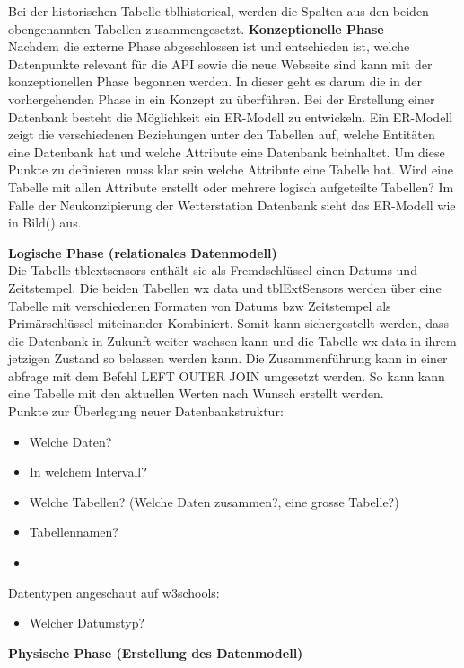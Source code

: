 Bei der historischen Tabelle tblhistorical, werden die Spalten aus den beiden obengenannten Tabellen zusammengesetzt.
\textbf{Konzeptionelle Phase}\\
Nachdem die externe Phase abgeschlossen ist und entschieden ist, welche Datenpunkte relevant für die API sowie die neue Webseite sind kann mit der konzeptionellen Phase begonnen werden. In dieser geht es darum die in der vorhergehenden Phase in ein Konzept zu überführen. Bei der Erstellung einer Datenbank besteht die Möglichkeit ein ER-Modell zu entwickeln. Ein ER-Modell zeigt die verschiedenen Beziehungen unter den Tabellen auf, welche Entitäten eine Datenbank hat und welche Attribute eine Datenbank beinhaltet. Um diese Punkte zu definieren muss klar sein welche Attribute eine Tabelle hat. Wird eine Tabelle mit allen Attribute erstellt oder mehrere logisch aufgeteilte Tabellen? Im Falle der Neukonzipierung der Wetterstation Datenbank sieht das ER-Modell wie in Bild() aus.

\textbf{Logische Phase (relationales Datenmodell)}\\
Die Tabelle tblextsensors  enthält sie als Fremdschlüssel einen Datums und Zeitstempel. Die beiden Tabellen wx data und tblExtSensors werden über eine Tabelle mit verschiedenen Formaten von Datums bzw Zeitstempel als Primärschlüssel miteinander Kombiniert. Somit kann sichergestellt werden, dass die Datenbank in Zukunft weiter wachsen kann und die Tabelle wx data in ihrem jetzigen Zustand so belassen werden kann. Die Zusammenführung kann in einer abfrage mit dem Befehl LEFT OUTER JOIN umgesetzt werden. So kann kann eine Tabelle mit den aktuellen Werten nach Wunsch erstellt werden.
\\

Punkte zur Überlegung neuer Datenbankstruktur:
\begin{itemize}
\item Welche Daten?
\item In welchem Intervall?
\item Welche Tabellen? (Welche Daten zusammen?, eine grosse Tabelle?)
\item Tabellennamen?
\item
\end{itemize}

Datentypen angeschaut auf w3schools:
\begin{itemize}
\item Welcher Datumstyp?

\end{itemize}
\textbf{Physische Phase (Erstellung des Datenmodell)}

